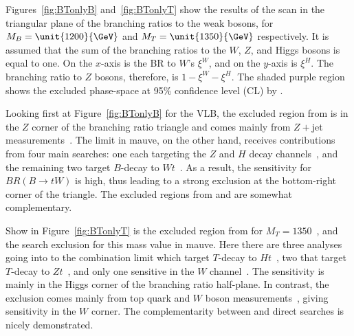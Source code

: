 Figures~\ref{fig:BTonlyB} and~\ref{fig:BTonlyT} show the results of the \contur scan in the triangular plane of the branching ratios to the weak bosons, for $M_B = \unit{1200}{\GeV}$ and $M_T = \unit{1350}{\GeV}$ respectively. It is assumed that the sum of the branching ratios to the $W$, $Z$, and Higgs bosons is equal to one. On the $x$-axis is the BR to $W$'s $\xi^W$, and on the $y$-axis is $\xi^H$. The branching ratio to $Z$ bosons, therefore, is $1-\xi^W-\xi^H$. The shaded purple region shows the excluded phase-space at 95\% confidence level (CL) by \ATLAS. 

Looking first at Figure~\ref{fig:BTonlyB} for the VLB, the excluded region from \contur is in the $Z$ corner of the branching ratio triangle and comes mainly from $Z+$jet measurements~\cite{Aad:2015auj,Aaboud:2017hox,Aaboud:2017hbk,Aaboud:2019jcc}. The \ATLAS limit in mauve, on the other hand, receives contributions from four main searches: one each targeting the $Z$ and $H$ decay channels~\cite{ZllSearch,HadSearch}, and the remaining two target $B$-decay to $Wt$~\cite{WtSearch,TriLepSearch}. As a result, the sensitivity for $BR(B\rightarrow tW)$ is high, thus leading to a strong exclusion at the bottom-right corner of the triangle. The excluded regions from \contur and \ATLAS are somewhat complementary. 

Show in Figure~\ref{fig:BTonlyT} is the excluded region from \contur for
$M_T = 1350$~\GeV, and the \ATLAS search exclusion for this mass value in mauve. Here there are three analyses going into to the \ATLAS combination limit which target $T$-decay to $Ht$~\cite{HbbSearch,TriLepSearch,HadSearch}, two that target $T$-decay to $Zt$~\cite{ZnunuSearch,ZllSearch}, and only one sensitive in the $W$ channel~\cite{WbSearch}. The \ATLAS sensitivity is mainly in the Higgs corner of the branching ratio half-plane. In contrast, the \contur exclusion comes mainly from top quark and $W$ boson measurements~\cite{Aaboud:2017fye,Aaboud:2018eqg,Sirunyan:2018wem,Khachatryan:2016mnb,Sirunyan:2018ptc}, giving sensitivity in the $W$ corner. The complementarity between \contur and direct searches is nicely demonstrated. 

